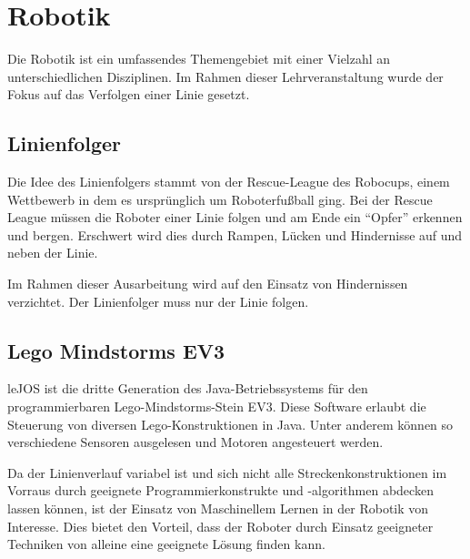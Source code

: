 \chapter{Robotik} %
\label{cha:robotik}

Die Robotik ist ein umfassendes Themengebiet mit einer Vielzahl an un\-ter\-schied\-lichen Disziplinen. Im Rahmen dieser Lehrveranstaltung wurde der Fokus auf das Verfolgen einer Linie gesetzt.

\section{Linienfolger} %
\label{sec:linienfolger}

Die Idee des Linienfolgers stammt von der Rescue-League des Robocups, einem Wettbewerb in dem es ursprünglich um Roboterfußball ging. Bei der Rescue League müssen die Roboter einer Linie folgen und am Ende ein \enquote{Opfer} erkennen und bergen. Erschwert wird dies durch Rampen, Lücken und Hindernisse auf und neben der Linie.\par
Im Rahmen dieser Ausarbeitung wird auf den Einsatz von Hindernissen verzichtet. Der Linienfolger muss nur der Linie folgen.


\section{Lego Mindstorms EV3} %
\label{sec:lego_mindstorm_ev3}

leJOS ist die dritte Generation des Java-Betriebssystems für den programmierbaren Lego-Mindstorms-Stein EV3. Diese Software erlaubt die Steuerung von diversen Lego-Konstruktionen in Java. Unter anderem können so verschiedene Sensoren ausgelesen und Motoren angesteuert werden.\par
Da der Linienverlauf variabel ist und sich nicht alle Streckenkonstruktionen im Vorraus durch geeignete Programmierkonstrukte und -algorithmen abdecken lassen können, ist der Einsatz von Maschinellem Lernen in der Robotik von Interesse. Dies bietet den Vorteil, dass der Roboter durch Einsatz geeigneter Techniken von alleine eine geeignete Lösung finden kann.


